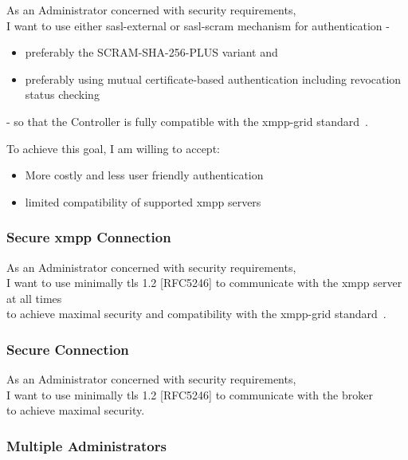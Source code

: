 As an Administrator concerned with security requirements,\\
I want to use either \gls{sasl-external} or \gls{sasl-scram} mechanism for authentication -

\begin{itemize}
    \item preferably the SCRAM-SHA-256-PLUS variant and
    \item preferably using mutual certificate-based authentication including revocation status checking
\end{itemize}

\noindent - so that the Controller is fully compatible with the \gls{xmpp-grid} standard~\cite{ietf-mile-xmpp-grid-05}.

\noindent To achieve this goal, I am willing to accept:
\begin{itemize}
    \item More costly and less user friendly authentication
    \item limited compatibility of supported \gls{xmpp} servers
\end{itemize}

\subsubsection{Secure \gls{xmpp} Connection}

As an Administrator concerned with security requirements,\\
I want to use minimally \gls{tls} 1.2 [RFC5246] to communicate with the \gls{xmpp} server at all times\\
to achieve maximal security and compatibility with the \gls{xmpp-grid} standard~\cite{ietf-mile-xmpp-grid-05}.

\subsubsection{Secure Connection}

As an Administrator concerned with security requirements,\\
I want to use minimally \gls{tls} 1.2 [RFC5246] to communicate with the \gls{broker}\\
to achieve maximal security.

\subsubsection{Multiple Administrators}\label{sec:requirement-multiple-administrators}

